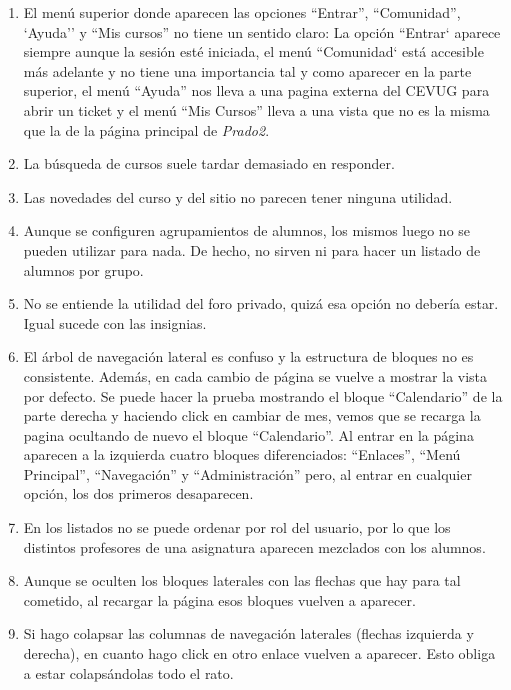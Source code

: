 \begin{enumerate}
\item El menú superior donde aparecen las opciones ``Entrar'', ``Comunidad'', `Ayuda'' y ``Mis cursos'' no tiene un sentido claro: La opción ``Entrar` aparece siempre aunque la sesión esté iniciada, el menú ``Comunidad` está accesible más adelante y no tiene una importancia tal y como aparecer en la parte superior, el menú ``Ayuda'' nos lleva a una pagina externa del CEVUG para abrir un ticket y el menú ``Mis Cursos'' lleva a una vista que no es la misma que la de la página principal de \textit{Prado2}.

\item La búsqueda de cursos suele tardar demasiado en responder.

\item Las novedades del curso y del sitio no parecen tener ninguna utilidad.

\item Aunque se configuren agrupamientos de alumnos, los mismos luego no se pueden utilizar para nada. De hecho, no sirven ni para hacer un listado de alumnos por grupo.

\item No se entiende la utilidad del foro privado, quizá esa opción no debería estar. Igual sucede con las insignias.

\item El árbol de navegación lateral es confuso y la estructura de bloques no es consistente. Además, en cada cambio de página se vuelve a mostrar la vista por defecto. Se puede hacer la prueba mostrando el bloque ``Calendario'' de la parte derecha y haciendo click en cambiar de mes, vemos que se recarga la pagina ocultando de nuevo el bloque ``Calendario''. Al entrar en la página aparecen a la izquierda cuatro bloques diferenciados: ``Enlaces'', ``Menú Principal'', ``Navegación'' y ``Administración'' pero, al entrar en cualquier opción, los dos primeros desaparecen.

\item En los listados no se puede ordenar por rol del usuario, por lo que los distintos profesores de una asignatura aparecen mezclados con los alumnos.

\item Aunque se oculten los bloques laterales con las flechas que hay para tal cometido, al recargar la página esos bloques vuelven a aparecer.

\item Si hago colapsar las columnas de navegación laterales (flechas izquierda y derecha), en cuanto hago click en otro enlace vuelven a aparecer. Esto obliga a estar colapsándolas todo el rato.


\end{enumerate}
